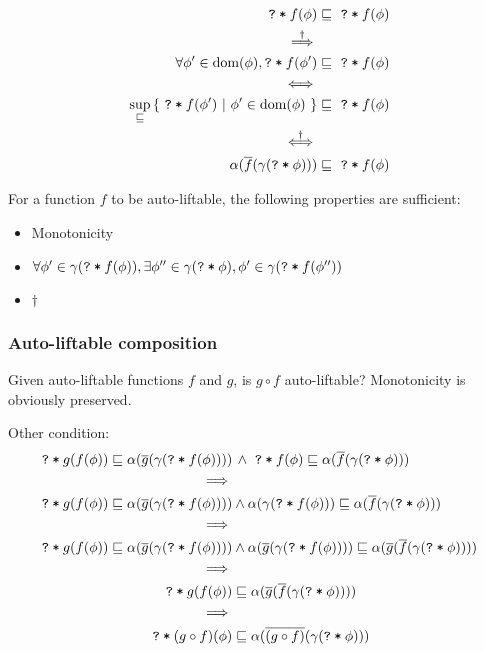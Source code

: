 \documentclass[11pt,a4paper]{article}
\begin{document}
\begin{align*}
\texttt{\texttt{?}\:*\:$f(\phi)$} &\sqsubseteq \,\,\texttt{\texttt{?}\:*\:$f(\phi)$} \\
\overset{\dagger}{\implies} \\
\forall \phi' \in \text{dom}(\phi), \texttt{\texttt{?}\:*\:$f(\phi')$} &\sqsubseteq \,\,\texttt{\texttt{?}\:*\:$f(\phi)$} \\
\iff \\
\sup_{\sqsubseteq} {\{~ \texttt{\texttt{?}\:*\:$f(\phi')$} ~|~ \phi' \in \text{dom}(\phi) ~\}} &\sqsubseteq \,\,\texttt{\texttt{?}\:*\:$f(\phi)$} \\
\overset{\dagger}{\iff} \\
\alpha(\overline{f}(\gamma(\texttt{\texttt{?}\:*\:$\phi$}))) &\sqsubseteq \,\,\texttt{\texttt{?}\:*\:$f(\phi)$}
\end{align*}

For a function $f$ to be auto-liftable, the following properties are sufficient:
\begin{itemize}
    \item Monotonicity
    \item $\forall \phi' \in \gamma(\texttt{\texttt{?}\:*\:$f(\phi)$}), \exists \phi'' \in \gamma(\texttt{\texttt{?}\:*\:$\phi$}), \phi' \in \gamma(\texttt{\texttt{?}\:*\:$f(\phi'')$})$ 
    \item $\dagger$
\end{itemize}

\subsubsection{Auto-liftable composition}
Given auto-liftable functions $f$ and $g$, is $g \circ f$ auto-liftable?
Monotonicity is obviously preserved.

Other condition:
\begin{align*}
\texttt{\texttt{?}\:*\:$g(f(\phi))$} \sqsubseteq \alpha(\overline{g}(\gamma(\texttt{\texttt{?}\:*\:$f(\phi)$}))) &\,\wedge
\,\,\texttt{\texttt{?}\:*\:$f(\phi)$} \sqsubseteq \alpha(\overline{f}(\gamma(\texttt{\texttt{?}\:*\:$\phi$}))) \\
\implies \\
\texttt{\texttt{?}\:*\:$g(f(\phi))$} \sqsubseteq \alpha(\overline{g}(\gamma(\texttt{\texttt{?}\:*\:$f(\phi)$}))) &\wedge
\alpha(\gamma(\texttt{\texttt{?}\:*\:$f(\phi)$})) \sqsubseteq \alpha(\overline{f}(\gamma(\texttt{\texttt{?}\:*\:$\phi$}))) \\
\implies \\
\texttt{\texttt{?}\:*\:$g(f(\phi))$} \sqsubseteq \alpha(\overline{g}(\gamma(\texttt{\texttt{?}\:*\:$f(\phi)$}))) &\wedge
\alpha(\overline{g}(\gamma(\texttt{\texttt{?}\:*\:$f(\phi)$}))) \sqsubseteq \alpha(\overline{g}(\overline{f}(\gamma(\texttt{\texttt{?}\:*\:$\phi$})))) \\
\implies \\
\texttt{\texttt{?}\:*\:$g(f(\phi))$} &\sqsubseteq \alpha(\overline{g}(\overline{f}(\gamma(\texttt{\texttt{?}\:*\:$\phi$})))) \\
\implies \\
\texttt{\texttt{?}\:*\:$(g \circ f)(\phi)$} &\sqsubseteq \alpha(\overline{(g \circ f)}(\gamma(\texttt{\texttt{?}\:*\:$\phi$}))) \\
\end{align*}
\end{document}
